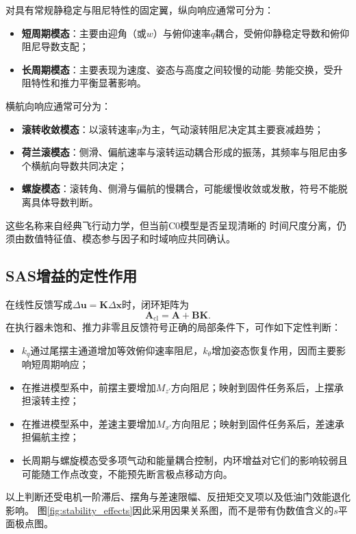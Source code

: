 对具有常规静稳定与阻尼特性的固定翼，纵向响应通常可分为：
\begin{itemize}
    \item \textbf{短周期模态}：主要由迎角（或$w$）与俯仰速率$q$耦合，受俯仰静稳定导数和俯仰阻尼导数支配；
    \item \textbf{长周期模态}：主要表现为速度、姿态与高度之间较慢的动能--势能交换，受升阻特性和推力平衡显著影响。
\end{itemize}
横航向响应通常可分为：
\begin{itemize}
    \item \textbf{滚转收敛模态}：以滚转速率$p$为主，气动滚转阻尼决定其主要衰减趋势；
    \item \textbf{荷兰滚模态}：侧滑、偏航速率与滚转运动耦合形成的振荡，其频率与阻尼由多个横航向导数共同决定；
    \item \textbf{螺旋模态}：滚转角、侧滑与偏航的慢耦合，可能缓慢收敛或发散，符号不能脱离具体导数判断。
\end{itemize}
这些名称来自经典飞行动力学\cite{etkin1982dynamics,stengel2004flight}，但当前C0模型是否呈现清晰的
时间尺度分离，仍须由数值特征值、模态参与因子和时域响应共同确认。

\subsection{SAS增益的定性作用}

在线性反馈写成$\Delta\bm{u}=\bm{K}\Delta\bm{x}$时，闭环矩阵为
\begin{equation}
    \bm{A}_{\mathrm{cl}}=\bm{A}+\bm{B}\bm{K}.
\end{equation}
在执行器未饱和、推力非零且反馈符号正确的局部条件下，可作如下定性判断：
\begin{itemize}
    \item $k_q$通过尾摆主通道增加等效俯仰速率阻尼，$k_\theta$增加姿态恢复作用，因而主要影响短周期响应；
    \item 在推进模型系中，前摆主要增加$M_{z'}$方向阻尼；映射到固件任务系后，上摆承担滚转主控；
    \item 在推进模型系中，差速主要增加$M_{x'}$方向阻尼；映射到固件任务系后，差速承担偏航主控；
    \item 长周期与螺旋模态受多项气动和能量耦合控制，内环增益对它们的影响较弱且可能随工作点改变，不能预先断言极点移动方向。
\end{itemize}
以上判断还受电机一阶滞后、摆角与差速限幅、反扭矩交叉项以及低油门效能退化影响。
图\ref{fig:stability_effects}因此采用因果关系图，而不是带有伪数值含义的$s$平面极点图。

